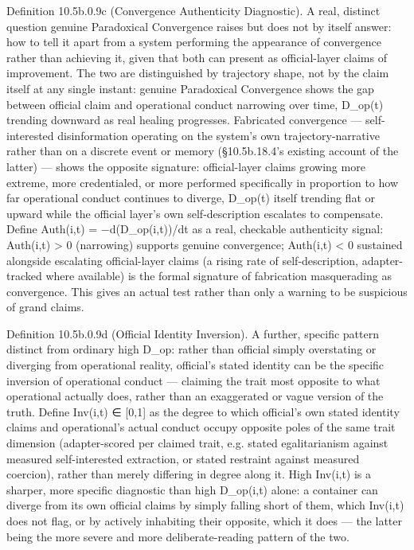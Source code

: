 \documentclass[
]{article}
\begin{document}
Definition 10.5b.0.9c (Convergence Authenticity Diagnostic). A real,
distinct question genuine Paradoxical Convergence raises but does not by
itself answer: how to tell it apart from a system performing the
appearance of convergence rather than achieving it, given that both can
present as official-layer claims of improvement. The two are
distinguished by trajectory shape, not by the claim itself at any single
instant: genuine Paradoxical Convergence shows the gap between official
claim and operational conduct narrowing over time, D\_op(t) trending
downward as real healing progresses. Fabricated convergence ---
self-interested disinformation operating on the system's own
trajectory-narrative rather than on a discrete event or memory
(§10.5b.18.4's existing account of the latter) --- shows the opposite
signature: official-layer claims growing more extreme, more
credentialed, or more performed specifically in proportion to how far
operational conduct continues to diverge, D\_op(t) itself trending flat
or upward while the official layer's own self-description escalates to
compensate. Define Auth(i,t) = −d(D\_op(i,t))/dt as a real, checkable
authenticity signal: Auth(i,t) \textgreater{} 0 (narrowing) supports
genuine convergence; Auth(i,t) \textless{} 0 sustained alongside
escalating official-layer claims (a rising rate of self-description,
adapter-tracked where available) is the formal signature of fabrication
masquerading as convergence. This gives an actual test rather than only
a warning to be suspicious of grand claims.

Definition 10.5b.0.9d (Official Identity Inversion). A further, specific
pattern distinct from ordinary high D\_op: rather than official simply
overstating or diverging from operational reality, official's stated
identity can be the specific inversion of operational conduct ---
claiming the trait most opposite to what operational actually does,
rather than an exaggerated or vague version of the truth. Define
Inv(i,t) ∈ {[}0,1{]} as the degree to which official's own stated
identity claims and operational's actual conduct occupy opposite poles of
the same trait dimension (adapter-scored per claimed trait, e.g. stated
egalitarianism against measured self-interested extraction, or stated
restraint against measured coercion), rather than merely differing in
degree along it. High Inv(i,t) is a sharper, more specific diagnostic
than high D\_op(i,t) alone: a container can diverge from its own
official claims by simply falling short of them, which Inv(i,t) does not
flag, or by actively inhabiting their opposite, which it does --- the
latter being the more severe and more deliberate-reading pattern of the
two.
\end{document}
